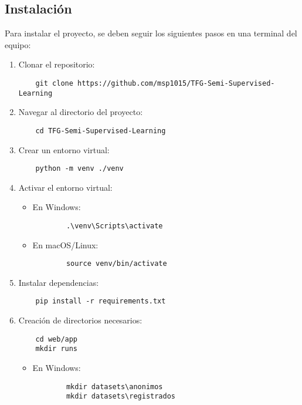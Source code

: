 \subsection{Instalación}

Para instalar el proyecto, se deben seguir los siguientes pasos en una terminal del equipo:

\begin{enumerate}
    \item Clonar el repositorio:
    \begin{verbatim}
    git clone https://github.com/msp1015/TFG-Semi-Supervised-Learning
    \end{verbatim}

    \item Navegar al directorio del proyecto:
    \begin{verbatim}
    cd TFG-Semi-Supervised-Learning
    \end{verbatim}

    \item Crear un entorno virtual:
    \begin{verbatim}
    python -m venv ./venv
    \end{verbatim}

    \item Activar el entorno virtual:
    \begin{itemize}
        \item En Windows:
        \begin{verbatim}
        .\venv\Scripts\activate
        \end{verbatim}

        \item En macOS/Linux:
        \begin{verbatim}
        source venv/bin/activate
        \end{verbatim}
    \end{itemize}

    \item Instalar dependencias:
    \begin{verbatim}
    pip install -r requirements.txt
    \end{verbatim}

    \item Creación de directorios necesarios:
    \begin{verbatim}
    cd web/app
    mkdir runs
    \end{verbatim}

    \begin{itemize}
        \item En Windows:
        \begin{verbatim}
        mkdir datasets\anonimos
        mkdir datasets\registrados
        \end{verbatim}


\end{itemize}
\end{enumerate}
